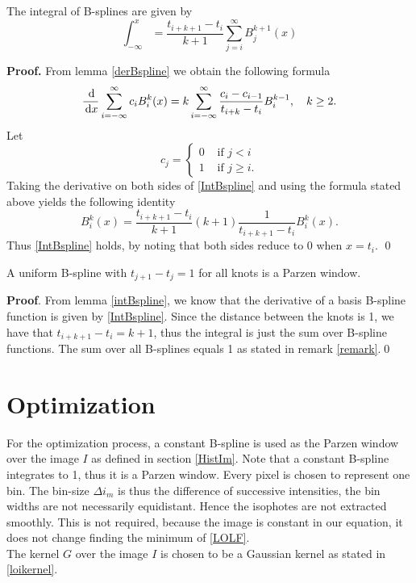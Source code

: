 \begin{lemma}\label{intBspline}
The integral of B-splines are given by
\begin{equation}
\int_{-\infty}^x = \frac{t_{i+k+1}-t_i}{k+1} \sum_{j=i}^\infty B_j^{k+1}(x)
\end{equation}
\end{lemma}
\textbf{Proof.} From lemma \ref{derBspline} we obtain the following formula
\begin{equation}
  \frac{\df}{\df x} \sum_{i=-\infty}^\infty c_i B_i^k(x) = k\sum_{i=-\infty}^\infty \frac{c_i-c_{i-1}}{t_{i+k}-t_i}B_i^{k-1}, \quad k\geq 2.\label{IntBspline}
\end{equation}
Let 
\[
  c_j = \begin{cases}0 & \mbox{ if } j<i\\ 1 & \mbox{ if } j\geq i.\end{cases}
\]
Taking the derivative on both sides of \eqref{IntBspline} and using the formula stated above yields the following identity
\begin{equation}
B_i^k(x) = \frac{t_{i+k+1}-t_{i}}{k+1}(k+1)\frac{1}{t_{i+k+1}-t_{i}}B_i^k(x).
\end{equation}
Thus \eqref{IntBspline} holds, by noting that both sides reduce to 0 when $x = t_i$. \hfill\qed\\

\begin{proposition}\label{PWBspline}
A uniform B-spline with $t_{j+1}-t_j = 1$ for all knots is a Parzen window.
\end{proposition}
\textbf{Proof}. From lemma \ref{intBspline}, we know that the derivative of a basis B-spline function is given by \eqref{IntBspline}. Since the distance between the knots is 1, we have that $t_{i+k+1}-t_i = k+1$, thus the integral is just the sum over B-spline functions. The sum over all B-splines equals 1 as stated in remark \ref{remark}.\hfill\qed


\section{Optimization}\label{section:OLopt}
For the optimization process, a constant B-spline is used as the Parzen window over the image $I$ as defined in section \ref{HistIm}. Note that a constant B-spline integrates to 1, thus it is a Parzen window. Every pixel is chosen to represent one bin. The bin-size $\Delta i_m$ is thus the difference of successive intensities, the bin widths are not necessarily equidistant. Hence the isophotes are not extracted smoothly. This is not required, because the image is constant in our equation, it does not change finding the minimum of \eqref{LOLF}.\\
The kernel $G$ over the image $I$ is chosen to be a Gaussian kernel as stated in \eqref{loikernel}. 

